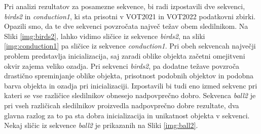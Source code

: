 \documentclass[a4paper,12pt,openright]{book}
\begin{document}
Pri analizi rezultatov za posamezne sekvence, bi radi izpostavili dve sekvenci, \emph{birds2} in \emph{conduction1}, ki sta prisotni v VOT2021 in VOT2022 podatkovni zbirki. Opazili smo, da te dve sekvenci povzročata največ težav obem sledilnikom.
Na Sliki \ref{img:birds2}, lahko vidimo sličice iz sekvence \emph{birds2}, na sliki \ref{img:conduction1} pa sličice iz sekvence \emph{conduction1}. Pri obeh sekvencah največji problem predstavlja inicializacija, saj zaradi oblike objekta začetni omejitveni okvir zajema veliko ozadja. Pri sekvenci \emph{birds2}, pa dodatne težave povzroča drastično spreminjanje oblike objekta, prisotnost podobnih objektov in podobna barva objekta in ozadja pri inicializaciji. Izpostavili bi tudi eno izmed sekvenc pri kateri se vse različice sledilnikov obnesejo nadpovprečno dobro. Sekvenca \emph{ball2} je pri vseh različicah sledilnikov proizvedla nadpovprečno dobre rezultate, dva glavna razlog za to pa sta dobra inicializacija in unikatnost objekta v sekvenci. Nekaj sličic iz sekvence \emph{ball2} je prikazanih na Sliki \ref{img:ball2}.


\end{document}
